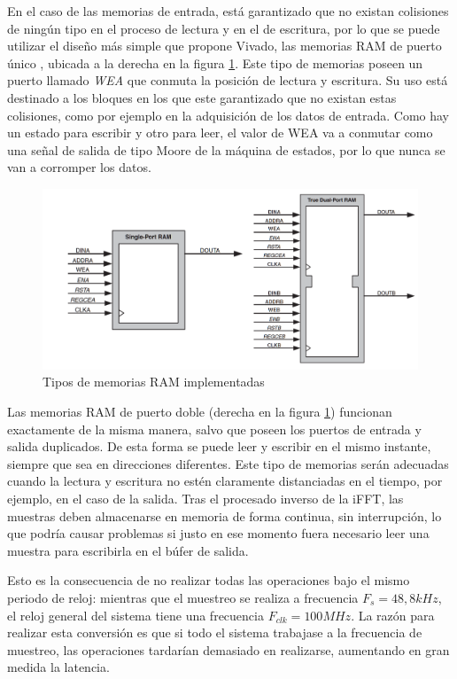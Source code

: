 En el caso de las memorias de entrada, está garantizado que no existan colisiones de ningún tipo en el proceso de lectura y en el de escritura, por lo que se puede utilizar el diseño más simple que propone Vivado, las memorias RAM de puerto único \cite{ram}, ubicada a la derecha en la figura \ref{fig:rams}. Este tipo de memorias poseen un puerto llamado \emph{WEA} que conmuta la posición de lectura y escritura. Su uso está destinado a los bloques en los que este garantizado que no existan estas colisiones, como por ejemplo en la adquisición de los datos de entrada. Como hay un estado para escribir y otro para leer, el valor de WEA va a conmutar como una señal de salida de tipo Moore de la máquina de estados, por lo que nunca se van a corromper los datos.

\begin{figure}[!b]
\begin{center}
\includegraphics[width=12cm]{img/rams.png}
\caption{\label{fig:rams}Tipos de memorias RAM implementadas}
\end{center}
\end{figure}

Las memorias RAM de puerto doble (derecha en la figura \ref{fig:rams}) funcionan exactamente de la misma manera, salvo que poseen los puertos de entrada y salida duplicados. De esta forma se puede leer y escribir en el mismo instante, siempre que sea en direcciones diferentes. Este tipo de memorias serán adecuadas cuando la lectura y escritura no estén claramente distanciadas en el tiempo, por ejemplo, en el caso de la salida. Tras el procesado inverso de la iFFT, las muestras deben almacenarse en memoria de forma continua, sin interrupción, lo que podría causar problemas si justo en ese momento fuera necesario leer una muestra para escribirla en el búfer de salida.

Esto es la consecuencia de no realizar todas las operaciones bajo el mismo periodo de reloj: mientras que el muestreo se realiza a frecuencia $F_{s}=48,8kHz$, el reloj general del sistema tiene una frecuencia $F_{clk} = 100MHz$. La razón para realizar esta conversión es que si todo el sistema trabajase a la frecuencia de muestreo, las operaciones tardarían demasiado en realizarse, aumentando en gran medida la latencia. 

